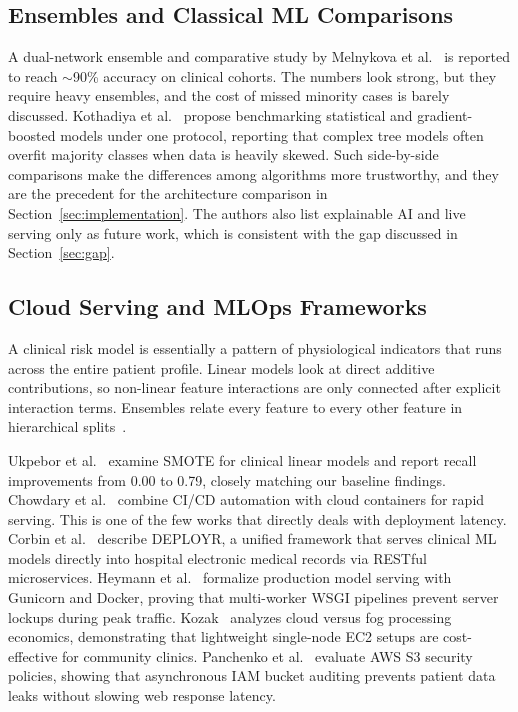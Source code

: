 \documentclass[10pt,journal,compsoc]{IEEEtran}
\begin{document}
\subsection{Ensembles and Classical ML Comparisons}
A dual-network ensemble and comparative study by Melnykova et al.~\cite{melnykova2025} is reported to reach $\sim$90\% accuracy on clinical cohorts. The numbers look strong, but they require heavy ensembles, and the cost of missed minority cases is barely discussed. Kothadiya et al.~\cite{kothadiya2023} propose benchmarking statistical and gradient-boosted models under one protocol, reporting that complex tree models often overfit majority classes when data is heavily skewed. Such side-by-side comparisons make the differences among algorithms more trustworthy, and they are the precedent for the architecture comparison in Section~\ref{sec:implementation}. The authors also list explainable AI and live serving only as future work, which is consistent with the gap discussed in Section~\ref{sec:gap}.

\subsection{Cloud Serving and MLOps Frameworks}
A clinical risk model is essentially a pattern of physiological indicators that runs across the entire patient profile. Linear models look at direct additive contributions, so non-linear feature interactions are only connected after explicit interaction terms. Ensembles relate every feature to every other feature in hierarchical splits~\cite{laurikkala2001}.

Ukpebor et al.~\cite{ukpebor2025} examine SMOTE for clinical linear models and report recall improvements from 0.00 to 0.79, closely matching our baseline findings. Chowdary et al.~\cite{chowdary2022} combine CI/CD automation with cloud containers for rapid serving. This is one of the few works that directly deals with deployment latency. Corbin et al.~\cite{corbin2023} describe DEPLOYR, a unified framework that serves clinical ML models directly into hospital electronic medical records via RESTful microservices. Heymann et al.~\cite{heymann2022} formalize production model serving with Gunicorn and Docker, proving that multi-worker WSGI pipelines prevent server lockups during peak traffic. Kozak~\cite{kozak2021} analyzes cloud versus fog processing economics, demonstrating that lightweight single-node EC2 setups are cost-effective for community clinics. Panchenko et al.~\cite{panchenko2024} evaluate AWS S3 security policies, showing that asynchronous IAM bucket auditing prevents patient data leaks without slowing web response latency.
\end{document}
